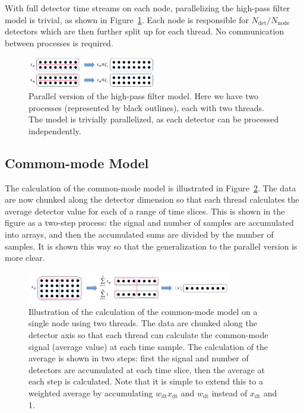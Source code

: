 \documentclass[oneside,11pt]{starlink}
\begin{document}
With full detector time streams on each node, parallelizing the
high-pass filter model is trivial, as shown in
Figure~\ref{fig:parallel_highpass}. Each node is responsible for
$N_{\mathrm{det}} / N_{\mathrm{node}}$ detectors which are then further
split up for each thread. No communication between processes is
required.

\begin{figure}[ht]
\begin{center}
\includegraphics[width=0.5\textwidth]{ssn79_parallel_highpass}
\caption[Parallel High-pass Filter Model]{Parallel version of the
  high-pass filter model. Here we have two processes (represented by
  black outlines), each with two threads. The model is trivially
  parallelized, as each detector can be processed independently.}
\label{fig:parallel_highpass}
\end{center}
\end{figure}

\subsection{Commom-mode Model}

The calculation of the common-mode model is illustrated in
Figure~\ref{fig:serial_common}. The data are now chunked along the
detector dimension so that each thread calculates the average detector
value for each of a range of time slices. This is shown in the figure
as a two-step process:  the signal and number of samples are
accumulated into arrays, and then the accumulated sums are divided by
the number of samples. It is shown this way so that the generalization
to the parallel version is more clear.

\begin{figure}[ht]
\begin{center}
\includegraphics[width=0.8\textwidth]{ssn79_serial_common}
\caption[Serial Common-mode Model]{Illustration of the calculation of
  the common-mode model on a single node using two threads. The data
  are chunked along the detector axis so that each thread can
  calculate the common-mode signal (average value) at each time
  sample. The calculation of the average is shown in two steps: first
  the signal and number of detectors are accumulated at each time
  slice, then the average at each step is calculated. Note that it is
  simple to extend this to a weighted average by accumulating
  $w_{\mathrm{dt}} x_{\mathrm{dt}}$ and $w_{\mathrm{dt}}$ instead of
  $x_{\mathrm{dt}}$ and 1.}
\label{fig:serial_common}
\end{center}
\end{figure}
\end{document}
